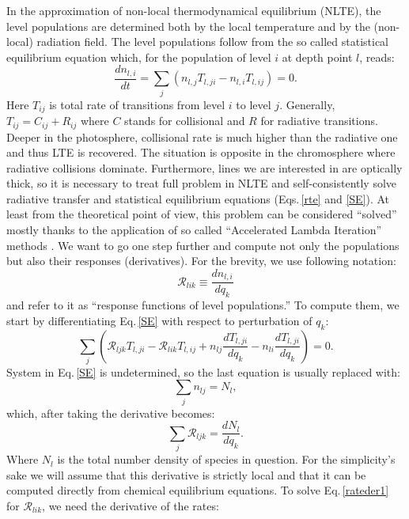 \documentclass[referee]{aa}
\begin{document}
In the approximation of non-local thermodynamical equilibrium (NLTE), the level populations are determined both by the local temperature and by the (non-local) radiation field. The level populations follow from the so called statistical equilibrium equation which, for the population of level $i$ at depth point $l$, reads:
\begin{equation}
 \frac{d n_{l,i}}{d t} = \sum_j (n_{l,j} T_{l,ji} - n_{l,i} T_{l,ij}) = 0.
 \label{SE}
\end{equation}
Here $T_{ij}$ is total rate of transitions from level $i$ to level $j$. Generally, $T_{ij} = C_{ij} + R_{ij}$ where $C$ stands for collisional and $R$ for radiative transitions. Deeper in the photosphere, collisional rate is much higher than the radiative one and thus LTE is recovered. The situation is opposite in the chromosphere where radiative collisions dominate. Furthermore, lines we are interested in are optically thick, so it is necessary to treat full problem in NLTE and self-consistently solve radiative transfer and statistical equilibrium equations (Eqs.\,\ref{rte} and \ref{SE}). At least from the theoretical point of view, this problem can be considered ``solved'' mostly thanks to the application of so called ``Accelerated Lambda Iteration'' methods \citep[for an insightful review see][]{Hubeny03}.  We want to go one step further and compute not only the populations but also their responses (derivatives). For the brevity, we use following notation:
\begin{equation}
 {\mathcal R}_{lik} \equiv \frac{d n_{l,i}}{d q_k}
\end{equation}
and refer to it as ``response functions of level populations.'' To compute them, we start by differentiating Eq.\,\ref{SE} with respect to perturbation of $q_k$:
\begin{equation}
 \sum_j \left ({\mathcal R}_{ljk} T_{l,ji} - {\mathcal R}_{lik} T_{l,ij} + n_{lj} \frac{d T_{l,ji}}{d q_k} - n_{li} \frac{d T_{l,ji}}{d q_k} \right ) = 0.
 \label{rateder1}
\end{equation}
System in Eq.\,\ref{SE} is undetermined, so the last equation is usually replaced with:
\begin{equation}
 \sum_j n_{lj} = N_l,
\end{equation}
which, after taking the derivative becomes:
\begin{equation}
 \sum_j {\mathcal R}_{ljk} = \frac{d N_l}{d q_k}.
\end{equation}
Where $N_l$ is the total number density of species in question. For the simplicity's sake we will assume that this derivative is strictly local and that it can be computed directly from chemical equilibrium equations. To solve Eq.\,\ref{rateder1} for $\mathcal{R}_{lik}$, we need the derivative of the rates:
\end{document}
